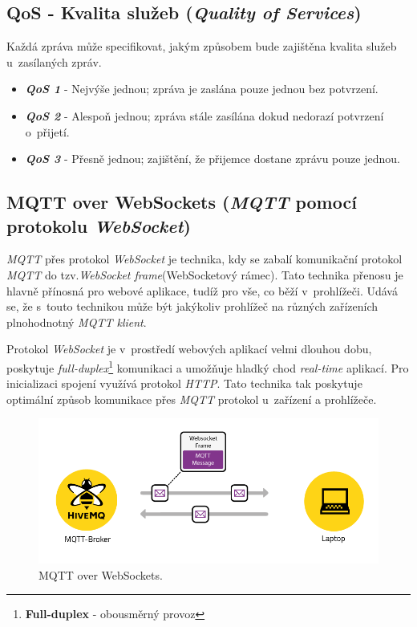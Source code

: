 \newpage
\subsection*{QoS - Kvalita služeb (\emph{Quality of Services})}
Každá zpráva může specifikovat, jakým způsobem bude zajištěna kvalita služeb u~zasílaných zpráv.~\cite{wiki:mqtt_broker}
\begin{itemize}
  \item \textbf{\emph{QoS 1}} - Nejvýše jednou; zpráva je zaslána pouze jednou bez potvrzení.
  \item \textbf{\emph{QoS 2}} - Alespoň jednou; zpráva stále zasílána dokud nedorazí potvrzení o~přijetí.
  \item \textbf{\emph{QoS 3}} - Přesně jednou; zajištění, že přijemce dostane zprávu pouze jednou.
\end{itemize}

\subsection*{MQTT over WebSockets (\emph{MQTT} pomocí protokolu \emph{WebSocket})}
\label{mqtt:websockets}
\emph{MQTT} přes protokol \emph{WebSocket} je technika, kdy se zabalí komunikační protokol \emph{MQTT} do tzv.\emph{WebSocket frame}(WebSocketový rámec).
Tato technika přenosu je hlavně přínosná pro webové aplikace, tudíž pro vše, co běží v~prohlížeči.
Udává se, že s~touto technikou může být jakýkoliv prohlížeč na různých zařízeních plnohodnotný \emph{MQTT klient}.~\cite{mqtt:hivemq}

Protokol \emph{WebSocket} je v~prostředí webových aplikací velmi dlouhou dobu, poskytuje \emph{full-duplex}\footnote{\textbf{Full-duplex} - obousměrný provoz} komunikaci a umožňuje hladký chod \emph{real-time} aplikací.
Pro inicializaci spojení využívá protokol \emph{HTTP}.
Tato technika tak poskytuje optimální způsob komunikace přes \emph{MQTT} protokol u~zařízení a prohlížeče.

\begin{figure}[ht]
  \centering
  \includegraphics[width=1 \linewidth]{obrazky-figures/mqtt_websocket.png}
  \caption{MQTT over WebSockets.~\cite{mqtt:hivemq}}
  \label{figure:mqtt_websockets}
\end{figure}

